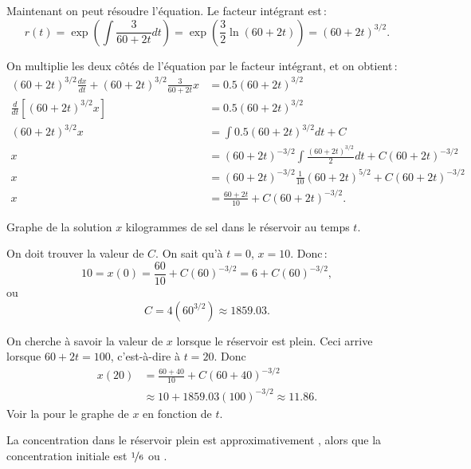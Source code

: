 \begin{example}
Maintenant on peut résoudre l'équation.  Le facteur intégrant est\,:  
\begin{equation*}
r(t) = \exp \left( \int \frac{3}{60+2t} dt  \right)
=
\exp \left( \frac{3}{2} \ln (60+2t) \right)
=
{(60+2t)}^{3/2} .
\end{equation*}

On multiplie les deux côtés de l'équation par le facteur intégrant, et on obtient\,: 
\begin{align*}
{(60+2t)}^{3/2} \frac{dx}{dt} +
{(60+2t)}^{3/2} \frac{3}{60+2t} x
& =
0.5{(60+2t)}^{3/2} \\
\frac{d}{dt}\left[
{(60+2t)}^{3/2} x \right]
& =
0.5{(60+2t)}^{3/2} \\
{(60+2t)}^{3/2} x
& =
\int 
0.5{(60+2t)}^{3/2}
dt
+C \\
 x
& =
{(60+2t)}^{-3/2} \int 
\frac{
{(60+2t)}^{3/2}
}{2}
dt
+C{(60+2t)}^{-3/2} \\
 x
& =
{(60+2t)}^{-3/2}
\frac{1}{10}{(60+2t)}^{5/2}
+C{(60+2t)}^{-3/2} \\
 x
& =
\frac{60+2t}{10}
+C{(60+2t)}^{-3/2} .
\end{align*}

\begin{mywrapfig}{3.25in}
\capstart
{}
\caption{Graphe de la solution $x$ kilogrammes de sel dans le réservoir au temps 
$t$.\label{linear-salt-graph:fig}}
\end{mywrapfig}
%
%
On doit trouver la valeur de $C$.  On sait qu'à $t=0$, $x=10$.  Donc\,: 
\begin{equation*}
10 = x(0)
=
\frac{60}{10}
+C{(60)}^{-3/2}
=
6
+C{(60)}^{-3/2} ,
\end{equation*}
ou
\begin{equation*}
C=4 ({60}^{3/2}) \approx 1859.03 .
\end{equation*}

On cherche à savoir la valeur de $x$ lorsque le réservoir est plein.  Ceci arrive lorsque $60+2t = 100$, c'est-à-dire à  $t=20$.  Donc
\begin{equation*}
\begin{split}
x(20) & = 
\frac{60+40}{10}
+C{(60+40)}^{-3/2}
\\
& \approx
10
+1859.03 {(100)}^{-3/2}
\approx
11.86 .
\end{split}
\end{equation*}
Voir la  pour le graphe de $x$ en fonction de $t$.

La concentration dans le réservoir plein est approximativement 
, alors que la concentration initiale est 
$\nicefrac{1}{6}$ ou .
\end{example}

